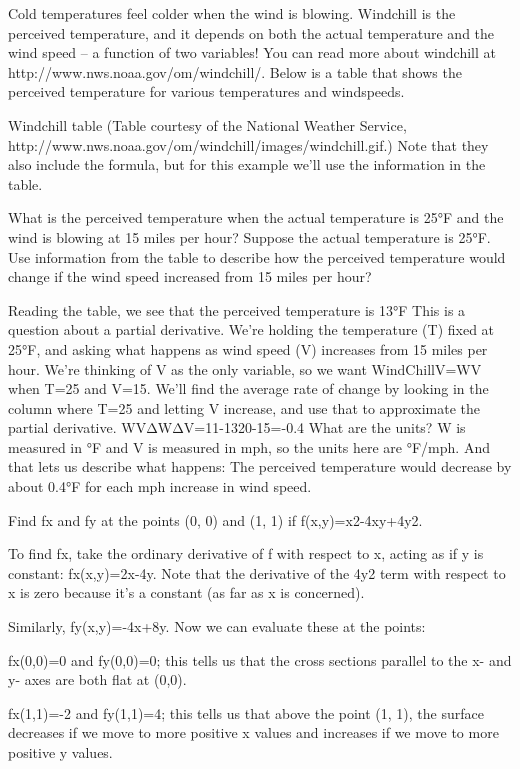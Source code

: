 \begin{example}
Cold temperatures feel colder when the wind is blowing. Windchill is the perceived temperature, and it depends on both the actual temperature and the wind speed – a function of two variables! You can read more about windchill at http://www.nws.noaa.gov/om/windchill/. Below is a table that shows the perceived temperature for various temperatures and windspeeds.

Windchill table
(Table courtesy of the National Weather Service, http://www.nws.noaa.gov/om/windchill/images/windchill.gif.)
Note that they also include the formula, but for this example we'll use the information in the table.

What is the perceived temperature when the actual temperature is 25°F and the wind is blowing at 15 miles per hour?
Suppose the actual temperature is 25°F. Use information from the table to describe how the perceived temperature would change if the wind speed increased from 15 miles per hour?

\begin{solution}
  Reading the table, we see that the perceived temperature is 13°F
This is a question about a partial derivative. We’re holding the temperature (T) fixed at 25°F, and asking what happens as wind speed (V) increases from 15 miles per hour. We’re thinking of V as the only variable, so we want WindChillV=WV when T=25 and V=15. We'll find the average rate of change by looking in the column where T=25 and letting V increase, and use that to approximate the partial derivative.
WV\approx   ΔWΔV=11-1320-15=-0.4
What are the units? W is measured in °F and V is measured in mph, so the units here are °F/mph. And that lets us describe what happens: The perceived temperature would decrease by about 0.4°F for each mph increase in wind speed.
\end{solution}\end{example}

\begin{example}
Find fx and fy at the points (0, 0) and (1, 1) if f(x,y)=x2-4xy+4y2.

\begin{solution}
  To find fx, take the ordinary derivative of f with respect to x, acting as if y is constant:
fx(x,y)=2x-4y.
Note that the derivative of the 4y2 term with respect to x is zero because it's a constant (as far as x is concerned).

Similarly,
fy(x,y)=-4x+8y.
Now we can evaluate these at the points:

fx(0,0)=0 and fy(0,0)=0; this tells us that the cross sections parallel to the x- and y- axes are both flat at (0,0).

fx(1,1)=-2 and fy(1,1)=4; this tells us that above the point (1, 1), the surface decreases if we move to more positive x values and increases if we move to more positive y values.
\end{solution}\end{example}

